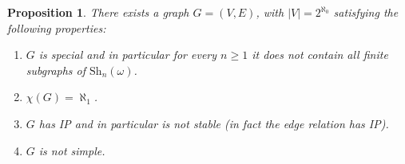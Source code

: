 \documentclass[a4paper]{amsart}
\theoremstyle{plain}
\newtheorem{proposition}[theorem]{Proposition}
\theoremstyle{definition}
\theoremstyle{remark}
\numberwithin{equation}{section}
\newcommand{\Sh}{\text{Sh}}
\begin{document}
\begin{proposition}\label{P:Hajnal-Komjath Example}\cite[Theorem 4]{HK}
There exists a graph $G=(V,E)$, with $|V|=2^{\aleph_0}$ satisfying the following properties:
\begin{enumerate}
\item $G$ is special and in particular for every $n\geq 1$ it does not contain all finite subgraphs of $\Sh_n(\omega)$.
\item $\chi(G)=\aleph_1$.
\item $G$ has IP and in particular is not stable (in fact the edge relation has IP).
\item $G$ is not simple.
\end{enumerate}
\end{proposition}
\end{document}
